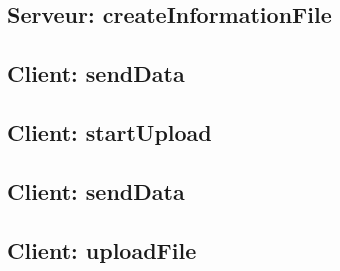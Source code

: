 \documentclass[11pt]{beamer}
\begin{document}
		\begin{frame}
			
		\end{frame}

		\begin{frame}
			
		\end{frame}

		\begin{frame}
			
		\end{frame}

		\begin{frame}
			
		\end{frame}

		\begin{frame}
			
		\end{frame}

		\begin{frame}
			
		\end{frame}

		\begin{frame}
			
		\end{frame}

	\subsection*{Serveur: createInformationFile}

		\begin{frame}
			
		\end{frame}

		\begin{frame}
			
		\end{frame}

	\subsection*{Client: sendData}
	
		\begin{frame}
			
		\end{frame}

	\subsection*{Client: startUpload}
	
		\begin{frame}
			
		\end{frame}

	\subsection*{Client: sendData}
	
		\begin{frame}
			
		\end{frame}

	\subsection*{Client: uploadFile}
	
		\begin{frame}
			
		\end{frame}

		\begin{frame}
			
		\end{frame}
\end{document}
